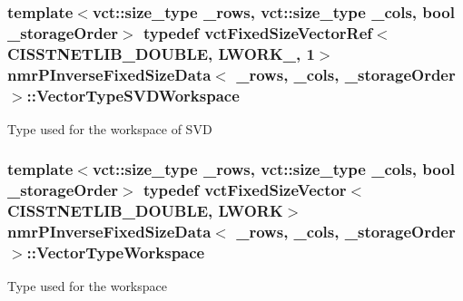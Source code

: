 \subsubsection[{Vector\+Type\+S\+V\+D\+Workspace}]{\setlength{\rightskip}{0pt plus 5cm}template$<$vct\+::size\+\_\+type \+\_\+rows, vct\+::size\+\_\+type \+\_\+cols, bool \+\_\+storage\+Order$>$ typedef {\bf vct\+Fixed\+Size\+Vector\+Ref}$<$C\+I\+S\+S\+T\+N\+E\+T\+L\+I\+B\+\_\+\+D\+O\+U\+B\+L\+E, {\bf L\+W\+O\+R\+K\+\_}, 1$>$ {\bf nmr\+P\+Inverse\+Fixed\+Size\+Data}$<$ \+\_\+rows, \+\_\+cols, \+\_\+storage\+Order $>$\+::{\bf Vector\+Type\+S\+V\+D\+Workspace}}\label{classnmr_p_inverse_fixed_size_data_aedbceacb820ab99ce724431b6f38d56e}
Type used for the workspace of S\+V\+D \hypertarget{classnmr_p_inverse_fixed_size_data_a801f15c74e8a0884df8cbee5fe0ed052}{}
\subsubsection[{Vector\+Type\+Workspace}]{\setlength{\rightskip}{0pt plus 5cm}template$<$vct\+::size\+\_\+type \+\_\+rows, vct\+::size\+\_\+type \+\_\+cols, bool \+\_\+storage\+Order$>$ typedef {\bf vct\+Fixed\+Size\+Vector}$<$C\+I\+S\+S\+T\+N\+E\+T\+L\+I\+B\+\_\+\+D\+O\+U\+B\+L\+E, {\bf L\+W\+O\+R\+K}$>$ {\bf nmr\+P\+Inverse\+Fixed\+Size\+Data}$<$ \+\_\+rows, \+\_\+cols, \+\_\+storage\+Order $>$\+::{\bf Vector\+Type\+Workspace}}\label{classnmr_p_inverse_fixed_size_data_a801f15c74e8a0884df8cbee5fe0ed052}
Type used for the workspace 

